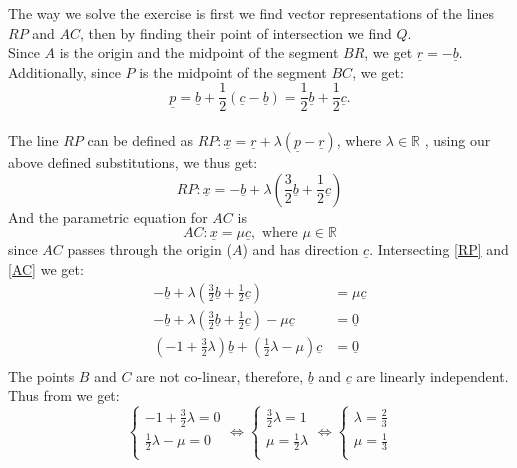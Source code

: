\documentclass{article}
\renewcommand{\v}[1]{\underline{#1}}
\begin{document}
    The way we solve the exercise is first we find vector representations of the lines $RP$ and $AC$, then by finding their point of intersection we find $Q$. \\

    Since $A$ is the origin and the midpoint of the segment $BR$, we get $\v{r} = - \v{b}$. Additionally, since $P$ is the
    midpoint of the segment $BC$, we get:
    $$\v{p} = \v{b} + \frac{1}{2}\left(\v{c} - \v{b}\right) = \frac{1}{2} \v{b} + \frac{1}{2} \v{c}.$$ \\
    The line $RP$ can be defined as $RP: \v{x} = \v{r} + \lambda \left(\v{p} - \v{r}\right)$, where $\lambda \in \mathbb{R}$ \cite{vecLineRep}, using our above defined substitutions, we thus get:
    \begin{equation}\label{RP}
    RP: \v{x} = - \v{b} + \lambda \left(\frac{3}{2} \v{b} + \frac{1}{2} \v{c}\right)
    \end{equation}
    And the parametric equation for $AC$ is
    \begin{equation}\label{AC}
    AC: \v{x} = \mu\v{c}, \text{ where } \mu \in \mathbb{R}
    \end{equation}
    since $AC$ passes through the origin ($A$) and has direction $\v{c}$.
    Intersecting \cref{RP} and \cref{AC} we get:
    \begin{align*}
        - \v{b} + \lambda \left(\frac{3}{2} \v{b} + \frac{1}{2} \v{c}\right) &= \mu \v{c} \\
        - \v{b} + \lambda \left(\frac{3}{2} \v{b} + \frac{1}{2} \v{c}\right) - \mu \v{c} &= \v{0} \\
        \left(-1 + \frac{3}{2} \lambda\right) \v{b} + \left(\frac{1}{2}\lambda - \mu\right)\v{c} &= \v{0} \\
    \end{align*}
    The points $B$ and $C$ are not co-linear, therefore, $\v{b}$ and $\v{c}$ are linearly independent. Thus from \cite{linIndepVecs} we get:
    $$
        \begin{cases}
            -1 + \frac{3}{2} \lambda = 0 \\
            \frac{1}{2}\lambda - \mu = 0 \\
        \end{cases}
        \iff
        \begin{cases}
            \frac{3}{2} \lambda = 1 \\
            \mu = \frac{1}{2} \lambda \\
        \end{cases}
        \iff
        \begin{cases}
            \lambda = \frac{2}{3} \\
            \mu = \frac{1}{3} \\
        \end{cases}
    $$
\end{document}
